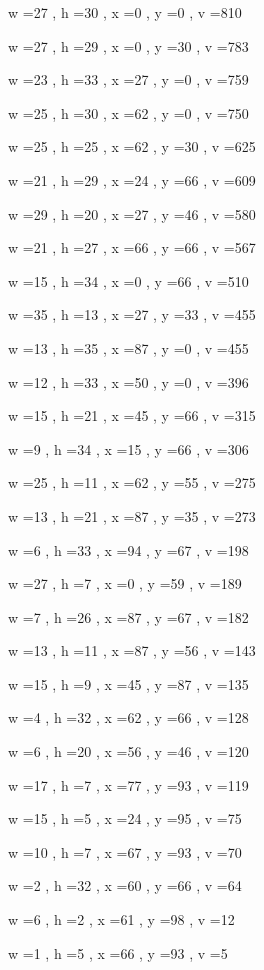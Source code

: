 \documentclass[11pt]{article}
\begin{document}
w =27 , h =30 , x =0 , y =0 , v =810
\par
w =27 , h =29 , x =0 , y =30 , v =783
\par
w =23 , h =33 , x =27 , y =0 , v =759
\par
w =25 , h =30 , x =62 , y =0 , v =750
\par
w =25 , h =25 , x =62 , y =30 , v =625
\par
w =21 , h =29 , x =24 , y =66 , v =609
\par
w =29 , h =20 , x =27 , y =46 , v =580
\par
w =21 , h =27 , x =66 , y =66 , v =567
\par
w =15 , h =34 , x =0 , y =66 , v =510
\par
w =35 , h =13 , x =27 , y =33 , v =455
\par
w =13 , h =35 , x =87 , y =0 , v =455
\par
w =12 , h =33 , x =50 , y =0 , v =396
\par
w =15 , h =21 , x =45 , y =66 , v =315
\par
w =9 , h =34 , x =15 , y =66 , v =306
\par
w =25 , h =11 , x =62 , y =55 , v =275
\par
w =13 , h =21 , x =87 , y =35 , v =273
\par
w =6 , h =33 , x =94 , y =67 , v =198
\par
w =27 , h =7 , x =0 , y =59 , v =189
\par
w =7 , h =26 , x =87 , y =67 , v =182
\par
w =13 , h =11 , x =87 , y =56 , v =143
\par
w =15 , h =9 , x =45 , y =87 , v =135
\par
w =4 , h =32 , x =62 , y =66 , v =128
\par
w =6 , h =20 , x =56 , y =46 , v =120
\par
w =17 , h =7 , x =77 , y =93 , v =119
\par
w =15 , h =5 , x =24 , y =95 , v =75
\par
w =10 , h =7 , x =67 , y =93 , v =70
\par
w =2 , h =32 , x =60 , y =66 , v =64
\par
w =6 , h =2 , x =61 , y =98 , v =12
\par
w =1 , h =5 , x =66 , y =93 , v =5
\par
\newpage
\end{document}

